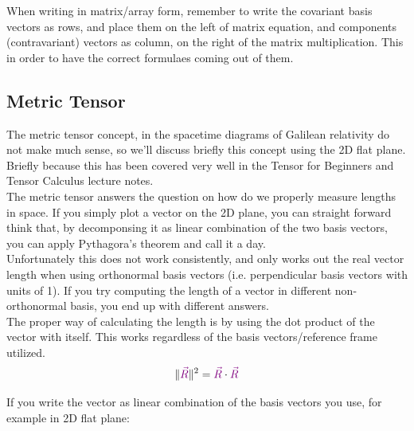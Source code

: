 When writing in matrix/array form, remember to write the covariant basis vectors as rows, and place them on the left of matrix equation, 
and components (contravariant) vectors as column, on the right of the matrix multiplication. This in order to have the correct formulaes coming out of them.

\subsection{Metric Tensor}

The metric tensor concept, in the spacetime diagrams of Galilean relativity do not make much sense, so 
we'll discuss briefly this concept using the 2D flat plane. Briefly because this has been covered very well
in the Tensor for Beginners and Tensor Calculus lecture notes.\\

The metric tensor answers the question on how do we properly measure lengths in space.
If you simply plot a vector on the 2D plane, you can straight forward think that, by decomponsing it 
as linear combination of the two basis vectors, you can apply Pythagora's theorem and call it a day.\\
Unfortunately this does not work consistently, and only works out the real vector length when using orthonormal basis vectors (i.e. 
perpendicular basis vectors with units of 1).
If you try computing the length of a vector in different non-orthonormal basis, you end up with different answers.\\

The proper way of calculating the length is by using the dot product of the vector with itself. This works regardless
of the basis vectors/reference frame utilized.\\

\begin{equation}
    \|\begingroup\color{violet}\vec{R}\endgroup \|^2 =  \begingroup\color{violet}\vec{R}\endgroup \cdot \begingroup\color{violet}\vec{R}\endgroup
\end{equation}

If you write the vector as linear combination of the basis vectors you use, for example in 2D flat plane:

